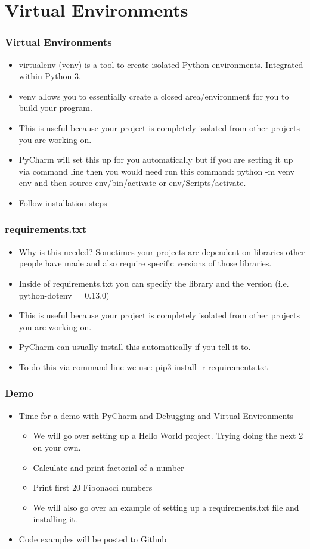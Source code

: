 \documentclass{beamer}
\begin{document}
\section{Virtual Environments}
\begin{frame}
  \frametitle{Virtual Environments}
  \begin{itemize}
  	\item virtualenv (venv) is a tool to create isolated Python environments. Integrated within Python 3.
  	\item venv allows you to essentially create a closed area/environment for you to build your program.
    \item This is useful because your project is completely isolated from other projects you are working on.
    \item PyCharm will set this up for you automatically but if you are setting it up via command line then you would need run this command: python -m venv env and then source env/bin/activate or env/Scripts/activate.
    \item Follow installation steps
   \end{itemize}
\end{frame}
\begin{frame}
  \frametitle{requirements.txt}
  \begin{itemize}
  	\item Why is this needed? Sometimes your projects are dependent on libraries other people have made and also require specific versions of those libraries.
  	\item Inside of requirements.txt you can specify the library and the version (i.e. python-dotenv==0.13.0)
    \item This is useful because your project is completely isolated from other projects you are working on.
    \item PyCharm can usually install this automatically if you tell it to.
    \item To do this via command line we use: pip3 install -r requirements.txt
   \end{itemize}
\end{frame}
\begin{frame}
  \frametitle{Demo}
  \begin{itemize}
  	\item Time for a demo with PyCharm and Debugging and Virtual Environments
  		\begin{itemize}
  			\item We will go over setting up a Hello World project. Trying doing the next 2 on your own.
  			\item Calculate and print factorial of a number
  			\item Print first 20 Fibonacci numbers
           \item We will also go over an example of setting up a requirements.txt file and installing it.
  		\end{itemize}
  	\item Code examples will be posted to Github
  \end{itemize}
   \end{frame}
\end{document}
